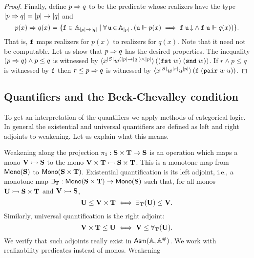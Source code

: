 \begin{proof}
  Finally, define $p \Rightarrow q$ to be the predicate whose realizers have
  the type $|p \Rightarrow q| = |p| \to |q|$ and
  \begin{equation*}
    p(x) \Rightarrow q(x) = \{
      \mathtt{f} \in \mathbb{A}_{|p| \to |q|} \mid
      \forall\, \mathtt{u} \,{\in}\, \mathbb{A}_{|p|}\,.\left(
        \mathtt{u} \Vdash p(x)
        \implies
        \mathtt{f}\;\mathtt{u}\,{\downarrow} \land
        \mathtt{f}\;\mathtt{u} \Vdash q(x)
      \right)
    \}.
  \end{equation*}
  That is, $\mathtt{f}$ maps realizers for $p(x)$ to realizers for $q(x)$.
  Note that it need not be computable. Let us show that $p \Rightarrow q$ has
  the desired properties. The inequality $(p \Rightarrow q) \land p \leq q$
  is witnessed by $\langle x^{|S|} w^{(|p| \to |q|)
      \times |p|} \rangle\,((\mathtt{fst}\;w)\; (\mathtt{snd}\;w))$. If $r \land p \leq
  q$ is witnessed by $\mathtt{f}$ then $r \leq p \Rightarrow q$ is witnessed by
  $\langle x^{|S|} w^{|r|}
    u^{|p|} \rangle\,(\mathtt{f}\;(\mathtt{pair}\;w\;u))$.
\end{proof}

\subsection{Quantifiers and the Beck-Chevalley condition}
\label{sec:quantifiers}

To get an interpretation of the quantifiers we apply methods of
categorical logic. In general the existential and universal
quantifiers are defined as left and right adjoints to weakening. Let
us explain what this means.

Weakening along the projection $\pi_1 : \mathbf{S} \times \mathbf{T} \to
\mathbf{S}$ is an operation which maps a mono $\mathbf{V} \rightarrowtail \mathbf{S}$
to the mono $\mathbf{V} \times \mathbf{T} \rightarrowtail \mathbf{S} \times \mathbf{T}$.
This is a monotone map from $\mathsf{Mono}(\mathbf{S})$ to $\mathsf{Mono}(\mathbf{S} \times
  \mathbf{T})$. Existential quantification is its left adjoint, i.e., a
monotone map $\exists_{\mathbf{T}} : \mathsf{Mono}(\mathbf{S} \times \mathbf{T}) \to
\mathsf{Mono}(\mathbf{S})$ such that, for all monos $\mathbf{U} \rightarrowtail \mathbf{S}
\times \mathbf{T}$ and $\mathbf{V} \rightarrowtail \mathbf{S}$,
%
\begin{equation*}
  \mathbf{U} \leq \mathbf{V} \times \mathbf{T}
  \iff
  \exists_{\mathbf{T}}(\mathbf{U}) \leq \mathbf{V}.
\end{equation*}
%
Similarly, universal quantification is the right adjoint:
%
\begin{equation*}
  \mathbf{V} \times \mathbf{T} \leq \mathbf{U}
  \iff
  \mathbf{V} \leq \forall_{\mathbf{T}}(\mathbf{U}).
\end{equation*}
%
We verify that such adjoints really exist in $\mathsf{Asm}(\mathbb{A},\mathbb{A}^{\#})$. We work with
realizability predicates instead of monos. Weakening 






